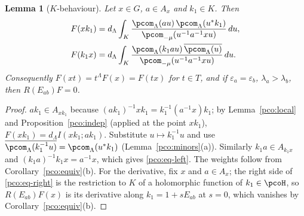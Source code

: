 \documentclass[10pt]{amsart}
\newtheorem{lemma}[theorem]{Lemma}
\theoremstyle{definition}
\theoremstyle{remark}
\begin{document}
\begin{lemma}[$K$-behaviour]\label{pco:K}
Let $x\in G$, $a\in A_x$ and $k_1\in K$. Then
\begin{align}
F(xk_1)&=d_\Lambda\int_K\frac{\pcom_\Lambda(au)\,\pcom_\Lambda(u^*k_1)}{\pcom_{-\mu}(u^{-1}a^{-1}xu)}\,du,
\label{pco:eq-right}\\
F(k_1x)&=d_\Lambda\int_K\frac{\pcom_\Lambda(k_1au)\,\overline{\pcom_\Lambda(u)}}{\pcom_{-\mu}(u^{-1}a^{-1}xu)}
\,du.\label{pco:eq-left}
\end{align}
Consequently $F(xt)=t^\Lambda F(x)=F(tx)$ for $t\in T$, and if $\varepsilon_a=\varepsilon_b$,
$\lambda_a>\lambda_b$, then $R(E_{ab})F=0$.
\end{lemma}
\begin{proof}
$ak_1\in A_{xk_1}$ because $(ak_1)^{-1}xk_1=k_1^{-1}(a^{-1}x)k_1$; by Lemma~\ref{pco:local} and
Proposition~\ref{pco:indep} (applied at the point $xk_1$), $F(xk_1)=d_\Lambda I(xk_1;ak_1)$. Substitute
$u\mapsto k_1^{-1}u$ and use $\overline{\pcom_\Lambda(k_1^{-1}u)}=\pcom_\Lambda(u^*k_1)$
(Lemma~\ref{pco:minors}(a)). Similarly $k_1a\in A_{k_1x}$ and $(k_1a)^{-1}k_1x=a^{-1}x$, which gives
\eqref{pco:eq-left}. The weights follow from Corollary~\ref{pco:equiv}(b). For the derivative, fix
$x$ and $a\in A_x$; the right side of \eqref{pco:eq-right} is the restriction to $K$ of a
holomorphic function of $k_1\in\pcoH$, so $R(E_{ab})F(x)$ is its derivative along
$k_1=1+sE_{ab}$ at $s=0$, which vanishes by Corollary~\ref{pco:equiv}(b).
\end{proof}
\end{document}
